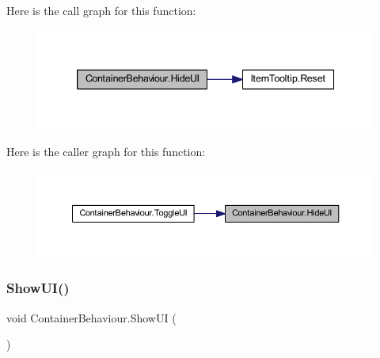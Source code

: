 Here is the call graph for this function\+:\nopagebreak
\begin{figure}[H]
\begin{center}
\leavevmode
\includegraphics[width=339pt]{class_container_behaviour_a0641e9fa2407bee1d83f4998b78f1fa3_cgraph}
\end{center}
\end{figure}
Here is the caller graph for this function\+:\nopagebreak
\begin{figure}[H]
\begin{center}
\leavevmode
\includegraphics[width=350pt]{class_container_behaviour_a0641e9fa2407bee1d83f4998b78f1fa3_icgraph}
\end{center}
\end{figure}
\mbox{\label{class_container_behaviour_ae4733d72cba5780939349f6d9beeba8f}} 
\subsubsection{\texorpdfstring{ShowUI()}{ShowUI()}}
{\footnotesize\ttfamily void Container\+Behaviour.\+Show\+UI (\begin{DoxyParamCaption}{ }\end{DoxyParamCaption})}


